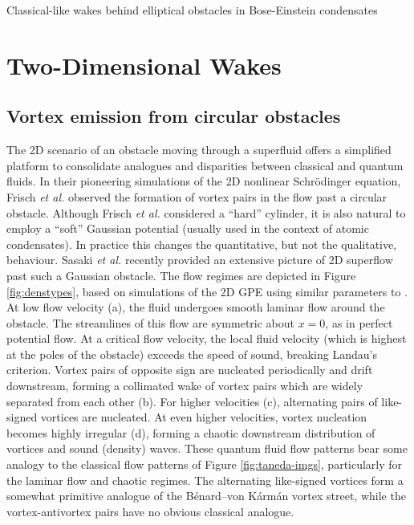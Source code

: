 \begin{chapter}{\label{cha:wake}Classical-like wakes behind elliptical obstacles in Bose-Einstein condensates}
\section{Two-Dimensional Wakes}
\subsection{Vortex emission from circular obstacles}\label{subsec:circular}
The 2D scenario of an obstacle moving through a superfluid offers a simplified platform to consolidate analogues and disparities between classical and quantum fluids. In their pioneering simulations of the 2D nonlinear Schr\"odinger equation, Frisch {\it et al.} \cite{frisch92} observed the formation of vortex pairs in the flow past a circular obstacle. Although Frisch {\it et al.} considered a ``hard'' cylinder, it is also natural to employ a ``soft'' Gaussian potential (usually used in the context of atomic condensates). In practice this changes the quantitative, but not the qualitative, behaviour.  Sasaki {\it et al.} \cite{saito10} recently provided an extensive picture of 2D superflow past such a Gaussian obstacle.   The flow regimes are depicted in Figure \ref{fig:denstypes}, based on simulations of the 2D GPE using similar parameters to \cite{saito10}.   At low flow velocity (a), the fluid undergoes smooth laminar flow around the obstacle.  The streamlines of this flow are symmetric about $x=0$, as in perfect potential flow.  At a critical flow velocity, the local fluid velocity (which is highest at the poles of the obstacle) exceeds the speed of sound, breaking Landau's criterion.  Vortex pairs of opposite sign are nucleated periodically and drift downstream, forming a collimated wake of vortex pairs which are widely separated from each other (b).  For higher velocities (c), alternating pairs of like-signed vortices are nucleated.  At even higher velocities, vortex nucleation becomes highly irregular (d), forming a chaotic downstream distribution of vortices and sound (density) waves.  These quantum fluid flow patterns bear some analogy to the classical flow patterns of Figure \ref{fig:taneda-imgs}, particularly for the laminar flow and chaotic regimes.  The alternating like-signed vortices form a somewhat primitive analogue of the B\'enard--von K\'arm\'an vortex street, while the vortex-antivortex pairs have no obvious classical analogue.  


\end{chapter}
